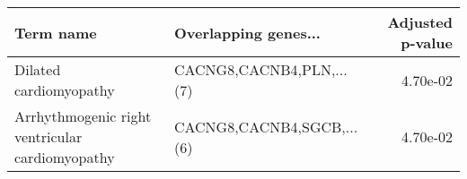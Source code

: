 \begin{tabular}{llr}
\toprule
                                      Term name &      Overlapping genes... &  Adjusted p-value \\
\midrule
                         Dilated cardiomyopathy &  CACNG8,CACNB4,PLN,...(7) &          4.70e-02 \\
Arrhythmogenic right ventricular cardiomyopathy & CACNG8,CACNB4,SGCB,...(6) &          4.70e-02 \\
\bottomrule
\end{tabular}
